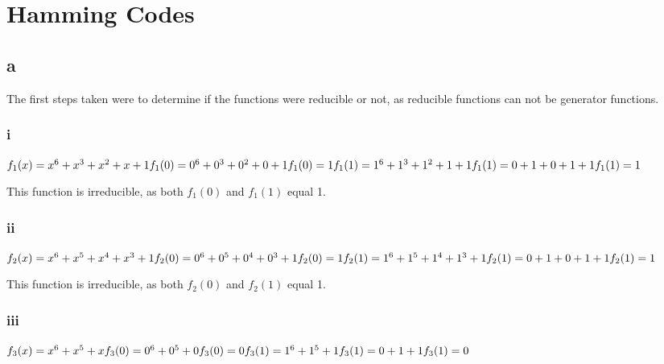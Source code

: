 \section{Hamming Codes}

\subsection{a}
The first steps taken were to determine if the functions were reducible or not, as reducible functions can not be generator functions.

\subsubsection{i}
$
f_{1}(x) = x^{6} + x^{3} + x^{2} + x + 1 \\
f_{1}(0) = 0^{6} + 0^{3} + 0^{2} + 0 + 1 \\
f_{1}(0) = 1	\\
f_{1}(1) = 1^{6} + 1^{3} + 1^{2} + 1 + 1 \\
f_{1}(1) = 0 + 1 + 0 + 1 + 1	\\
f_{1}(1) = 1	\\
$

This function is irreducible, as both $f_{1}(0)$ and $f_{1}(1)$ equal 1.

\subsubsection{ii}
$
f_{2}(x) = x^{6} + x^{5} + x^{4} + x^{3} + 1 	\\
f_{2}(0) = 0^{6} + 0^{5} + 0^{4} + 0^{3} + 1 	\\
f_{2}(0) = 1	\\
f_{2}(1) = 1^{6} + 1^{5} + 1^{4} + 1^{3} + 1 	\\
f_{2}(1) = 0 + 1 + 0 + 1 + 1 	\\
f_{2}(1) = 1 	\\
$

This function is irreducible, as both $f_{2}(0)$ and $f_{2}(1)$ equal 1.

\subsubsection{iii}
$
f_{3}(x) = x^{6} + x^{5} + x 	\\
f_{3}(0) = 0^{6} + 0^{5} + 0 	\\
f_{3}(0) = 0	\\
f_{3}(1) = 1^{6} + 1^{5} + 1 	\\
f_{3}(1) = 0 + 1 + 1 	\\
f_{3}(1) = 0 	\\
$

